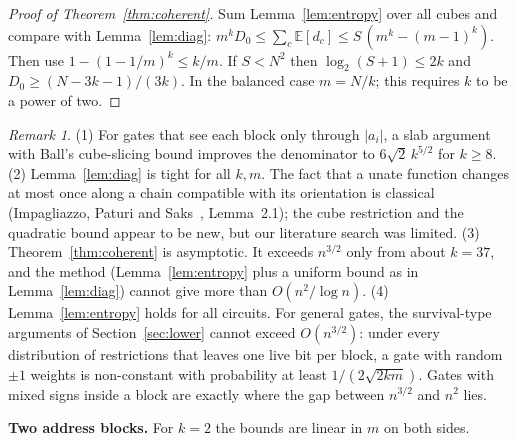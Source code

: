 \documentclass[11pt,letterpaper]{article}
\theoremstyle{remark}
\newtheorem*{remark}{Remark}
\newcommand{\smalltitle}[1]{\textbf{\color{ink}#1}\quad}
\begin{document}
\begin{proof}[Proof of Theorem~\ref{thm:coherent}]
Sum Lemma~\ref{lem:entropy} over all cubes and compare with
Lemma~\ref{lem:diag}: $m^kD_0\le\sum_c\mathbb E[d_c]\le S\,(m^k-(m-1)^k)$.
Then use $1-(1-1/m)^k\le k/m$. If $S<N^2$ then $\log_2(S+1)\le2k$ and
$D_0\ge(N-3k-1)/(3k)$. In the balanced case $m=N/k$; this requires $k$ to be
a power of two.
\end{proof}

\begin{remark}
(1) For gates that see each block only through $|a_i|$, a slab argument with
Ball's cube-slicing bound improves the denominator to $6\sqrt2\,k^{5/2}$ for
$k\ge8$. (2) Lemma~\ref{lem:diag} is tight for all $k,m$. The fact that a
unate function changes at most once along a chain compatible with its
orientation is classical (Impagliazzo, Paturi and Saks~\cite{IPS},
Lemma~2.1); the cube restriction and the quadratic bound appear to be new,
but our literature search was limited. (3) Theorem~\ref{thm:coherent} is
asymptotic. It exceeds $n^{3/2}$ only from about $k=37$, and the method
(Lemma~\ref{lem:entropy} plus a uniform bound as in Lemma~\ref{lem:diag})
cannot give more than $O(n^2/\log n)$. (4) Lemma~\ref{lem:entropy} holds for
all circuits. For general gates, the survival-type arguments of
Section~\ref{sec:lower} cannot exceed $O(n^{3/2})$: under every
distribution of restrictions that leaves one live bit per block, a gate with
random $\pm1$ weights is non-constant with probability at least
$1/(2\sqrt{2km})$. Gates with mixed signs inside a block are exactly where
the gap between $n^{3/2}$ and $n^2$ lies.
\end{remark}

\smalltitle{Two address blocks.}
For $k=2$ the bounds are linear in $m$ on both sides.
\end{document}
